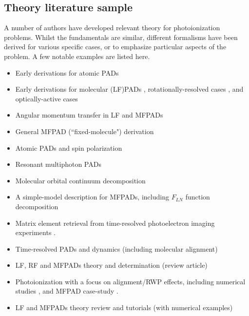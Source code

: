 \documentclass[10pt]{article}
\begin{document}
\subsection{Theory literature sample\label{sec:theory-lit}}

A number of authors have developed relevant theory for photoionization problems. Whilst the fundamentals are similar, different formalisms have been derived for various specific cases, or to emphasize particular aspects of the problem. A few notable examples are listed here.

\begin{itemize}
\item Early derivations for atomic PADs \cite{Cherepkov1979,Cooper1968,Cooper1969}
\item Early derivations for molecular (LF)PADs \cite{Tully1968}, rotationally-resolved cases \cite{Buckingham1970}, and optically-active cases \cite{Ritchie1976}
\item Angular momentum transfer in LF and MFPADs \cite{Fano1972} 
\item General MFPAD (``fixed-molecule") derivation \cite{Dill1976}
\item Atomic PADs and spin polarization \cite{Klar1982}
\item Resonant multiphoton PADs \cite{Dixit1983}
\item Molecular orbital continuum decomposition \cite{Park1996}
\item A simple-model description for MFPADs, including $F_{LN}$ function decomposition \cite{Lucchese2004}
\item Matrix element retrieval from time-resolved photoelectron imaging experiments \cite{Suzuki2007}.
\item Time-resolved PADs and dynamics (including molecular alignment) \cite{Underwood2000,Seideman2001,Stolow2008}
\item LF, RF and MFPADs theory and determination (review article) \cite{dowek2012PhotoionizationDynamicsPhotoemission}
\item Photoionization with a focus on alignment/RWP effects, including numerical studies \cite{Ramakrishna2012, Ramakrishna2013,hockett2015GeneralPhenomenologyIonization}, and MFPAD case-study \cite{reid2018AccessingMolecularFramea}.
\item LF and MFPADs theory review and tutorials (with numerical examples) \cite{hockett2018QMP1}
\end{itemize}
\end{document}
